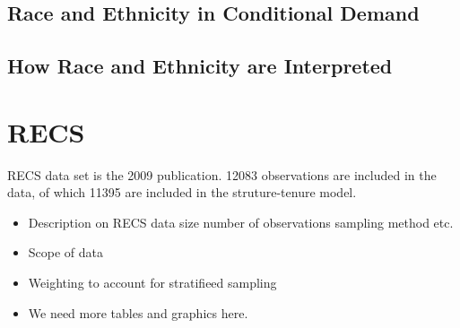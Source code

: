 \documentclass{article}
\begin{document}
\cite{RBase}




  \subsection{Race and Ethnicity in Conditional Demand}
  
  \subsection{How Race and Ethnicity are Interpreted}

\section{RECS}

RECS data set is the 2009 publication.  12083 observations are included in the data, of which 11395 are included in the struture-tenure model.
\begin{itemize}
  \item Description on RECS data size number of observations sampling method etc.
  \item Scope of data  
  \item Weighting to account for stratifieed sampling
  \item We need more tables and graphics here.
\end{itemize}
\end{document}
